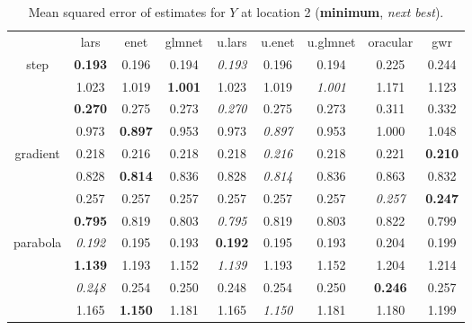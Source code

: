 \documentclass[authoryear, review, 11pt]{elsarticle}
\begin{document}
\begin{table}[ht]
\begin{center}
\begin{tabular}{ccccccccc}
  & lars & enet & glmnet & u.lars & u.enet & u.glmnet & oracular & gwr \\ 
  \cline{2-9}
  \multirow{4}{*}{step} & \textbf{0.193} & 0.196 & 0.194 & \emph{0.193} & 0.196 & 0.194 & 0.225 & 0.244 \\ 
  & 1.023 & 1.019 & \textbf{1.001} & 1.023 & 1.019 & \emph{1.001} & 1.171 & 1.123 \\ 
  & \textbf{0.270} & 0.275 & 0.273 & \emph{0.270} & 0.275 & 0.273 & 0.311 & 0.332 \\ 
  & 0.973 & \textbf{0.897} & 0.953 & 0.973 & \emph{0.897} & 0.953 & 1.000 & 1.048 \\ 
  \cline{2-9}
  \multirow{4}{*}{gradient} & 0.218 & 0.216 & 0.218 & 0.218 & \emph{0.216} & 0.218 & 0.221 & \textbf{0.210} \\ 
  & 0.828 & \textbf{0.814} & 0.836 & 0.828 & \emph{0.814} & 0.836 & 0.863 & 0.832 \\ 
  & 0.257 & 0.257 & 0.257 & 0.257 & 0.257 & 0.257 & \emph{0.257} & \textbf{0.247} \\ 
  & \textbf{0.795} & 0.819 & 0.803 & \emph{0.795} & 0.819 & 0.803 & 0.822 & 0.799 \\ 
  \cline{2-9}
  \multirow{4}{*}{parabola} & \emph{0.192} & 0.195 & 0.193 & \textbf{0.192} & 0.195 & 0.193 & 0.204 & 0.199 \\ 
  & \textbf{1.139} & 1.193 & 1.152 & \emph{1.139} & 1.193 & 1.152 & 1.204 & 1.214 \\ 
  & \emph{0.248} & 0.254 & 0.250 & 0.248 & 0.254 & 0.250 & \textbf{0.246} & 0.257 \\ 
  & 1.165 & \textbf{1.150} & 1.181 & 1.165 & \emph{1.150} & 1.181 & 1.180 & 1.199 \\ 
  \end{tabular}
\caption{Mean squared error of estimates for $Y$ at location 2 (\textbf{minimum}, \emph{next best}).\label{table:loc2-MSEY}}
\end{center}
\end{table}
\end{document}
